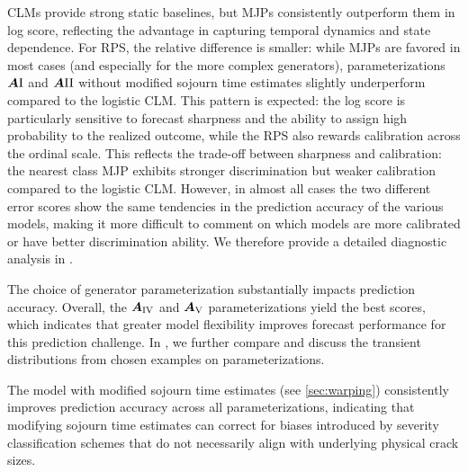 CLMs provide strong static baselines, but MJPs consistently outperform them in log score, reflecting the advantage in capturing temporal dynamics and state dependence. For RPS, the relative difference is smaller: while MJPs are favored in most cases (and especially for the more complex generators), parameterizations $\bm{A}{\RN{1}}$ and $\bm{A}{\RN{2}}$ without modified sojourn time estimates slightly underperform compared to the logistic CLM.
This pattern is expected: the log score is particularly sensitive to forecast sharpness and the ability to assign high probability to the realized outcome, while the RPS also rewards calibration across the ordinal scale. 
This reflects the trade-off between sharpness and calibration: the nearest class MJP exhibits stronger discrimination but weaker calibration compared to the logistic CLM.
However, in almost all cases the two different error scores show the same tendencies in the prediction accuracy of the various models, making it more difficult to comment on which models are more calibrated or have better discrimination ability. We therefore provide a detailed diagnostic analysis in .

The choice of generator parameterization substantially impacts prediction accuracy. 
Overall, the $\bm{A}_{\RN{4}}$ and $\bm{A}_{\RN{5}}$ parameterizations yield the best scores, which indicates that greater model flexibility improves forecast performance for this prediction challenge.
In , we further compare and discuss the transient distributions from chosen examples on parameterizations.

The model with modified sojourn time estimates (see \cref{sec:warping}) consistently improves prediction accuracy across all parameterizations, indicating that modifying sojourn time estimates can correct for biases introduced by severity classification schemes that do not necessarily align with underlying physical crack sizes. 

